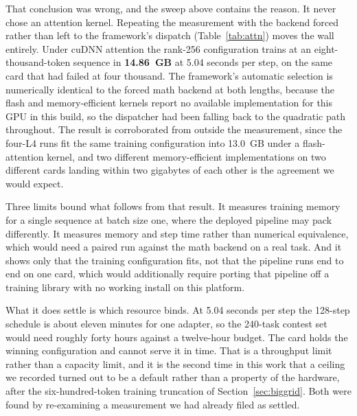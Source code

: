 \documentclass[11pt]{article}
\begin{document}
That conclusion was wrong, and the sweep above contains the reason. It never chose an attention kernel.
Repeating the measurement with the backend forced rather than left to the framework's dispatch
(Table~\ref{tab:attn}) moves the wall entirely. Under cuDNN attention the rank-256 configuration trains at
an eight-thousand-token sequence in \textbf{14.86~GB} at 5.04 seconds per step, on the same card that had
failed at four thousand. The framework's automatic selection is numerically identical to the forced math
backend at both lengths, because the flash and memory-efficient kernels report no available implementation
for this GPU in this build, so the dispatcher had been falling back to the quadratic path throughout. The
result is corroborated from outside the measurement, since the four-L4 runs fit the same training
configuration into 13.0~GB under a flash-attention kernel, and two different memory-efficient
implementations on two different cards landing within two gigabytes of each other is the agreement we would
expect.

Three limits bound what follows from that result. It measures training memory
for a single sequence at batch size one, where the deployed pipeline may pack differently. It measures
memory and step time rather than numerical equivalence, which would need a paired run against the math
backend on a real task. And it shows only that the training configuration fits, not that the pipeline runs
end to end on one card, which would additionally require porting that pipeline off a training library with
no working install on this platform.

What it does settle is which resource binds. At 5.04 seconds per step the 128-step schedule is about eleven
minutes for one adapter, so the 240-task contest set would need roughly forty hours against a twelve-hour
budget. The card holds the winning configuration and cannot serve it in time. That is a throughput limit
rather than a capacity limit, and it is the second time in this work that a ceiling we recorded turned out
to be a default rather than a property of the hardware, after the six-hundred-token training truncation of
Section~\ref{sec:biggrid}. Both were found by re-examining a measurement we had already filed as settled.
\end{document}
